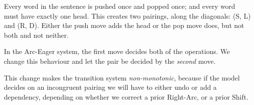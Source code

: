 \documentclass[11pt,letterpaper]{article}
\newcommand{\maybe}[1]{\textcolor{gray}{#1}}
\begin{document}
Every word in the sentence is pushed once and popped once; and every
word must have exactly one head. This creates two pairings, along the
diagonals: (S, L) and (R, D).
Either the push move adds the head or the pop move does, but not both and not neither.

In the Arc-Eager system, the first move decides both of the operations.
We change this behaviour and let the pair be decided by the \emph{second} move.

This change makes the transition system \emph{non-monotonic}, because if the model decides
on an incongruent pairing
we will have to either undo or add a
dependency, depending on whether we correct a prior Right-Arc, or a prior Shift.


\end{document}
